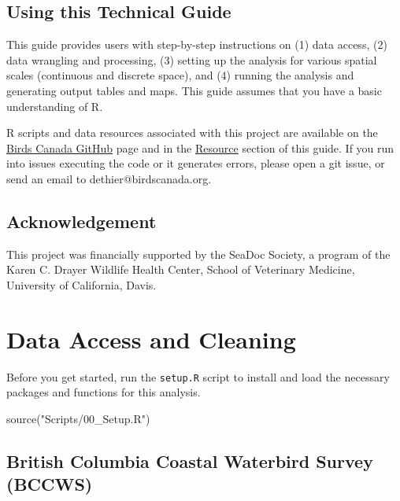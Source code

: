 \documentclass[
  letterpaper,
  DIV=11,
  numbers=noendperiod]{scrreprt}
\newenvironment{Shaded}{\begin{snugshade}}{\end{snugshade}}
\newcommand{\FunctionTok}[1]{\textcolor[rgb]{0.28,0.35,0.67}{#1}}
\newcommand{\NormalTok}[1]{\textcolor[rgb]{0.00,0.23,0.31}{#1}}
\newcommand{\StringTok}[1]{\textcolor[rgb]{0.13,0.47,0.30}{#1}}
\begin{document}
\section{Using this Technical Guide}\label{1.4Intro}

This guide provides users with step-by-step instructions on (1) data
access, (2) data wrangling and processing, (3) setting up the analysis
for various spatial scales (continuous and discrete space), and (4)
running the analysis and generating output tables and maps. This guide
assumes that you have a basic understanding of R.

R scripts and data resources associated with this project are available
on the \href{https://github.com/BirdsCanada}{Birds Canada GitHub} page
and in the \hyperref[9.9BirdsCan]{Resource} section of this guide. If
you run into issues executing the code or it generates errors, please
open a git issue, or send an email to dethier@birdscanada.org.

\section{Acknowledgement}\label{acknowledgement}

This project was financially supported by the SeaDoc Society, a program
of the Karen C. Drayer Wildlife Health Center, School of Veterinary
Medicine, University of California, Davis.


\chapter{Data Access and Cleaning}\label{data-access-and-cleaning}

Before you get started, run the \texttt{setup.R} script to install and
load the necessary packages and functions for this analysis.

\begin{Shaded}
\begin{Highlighting}[]
\FunctionTok{source}\NormalTok{(}\StringTok{"Scripts/00\_Setup.R"}\NormalTok{)}
\end{Highlighting}
\end{Shaded}

\section{British Columbia Coastal Waterbird Survey
(BCCWS)}\label{2.1Data}
\end{document}
